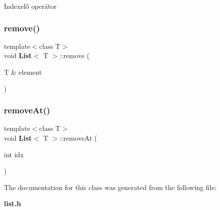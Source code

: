 Indexelő operátor \mbox{\label{class_list_ab20b18c4facb9c8ab89640c202057b80}} 
\subsubsection{remove()}
{\footnotesize\ttfamily template$<$class T$>$ \\
void \textbf{ List}$<$ T $>$\+::remove (\begin{DoxyParamCaption}\item[{T \&}]{element }\end{DoxyParamCaption})\hspace{0.3cm}{\ttfamily [inline]}}

\mbox{\label{class_list_a54fa90e725d350cd7bd41270ebdfe775}} 
\subsubsection{remove\+At()}
{\footnotesize\ttfamily template$<$class T$>$ \\
void \textbf{ List}$<$ T $>$\+::remove\+At (\begin{DoxyParamCaption}\item[{int}]{idx }\end{DoxyParamCaption})\hspace{0.3cm}{\ttfamily [inline]}}



The documentation for this class was generated from the following file\+:\begin{DoxyCompactItemize}
\item 
\textbf{ list.\+h}\end{DoxyCompactItemize}
